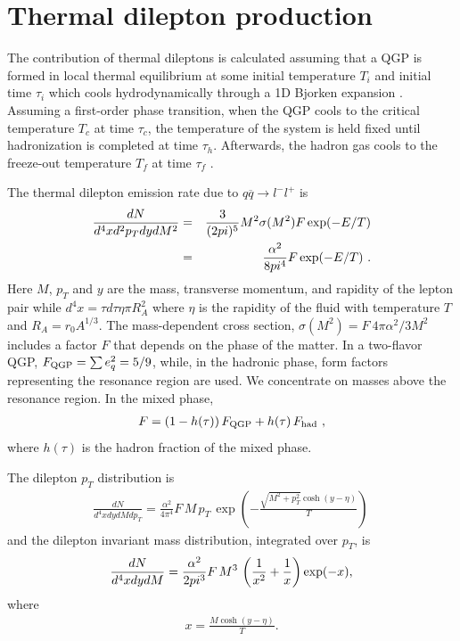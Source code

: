 \section{Thermal dilepton production}

The contribution of thermal dileptons is calculated assuming that
a QGP is formed in local thermal equilibrium at some initial temperature $T_i$ 
and initial time $\tau_i$ which cools hydrodynamically through a 1D Bjorken 
expansion \cite{Bjorken}.  Assuming a first-order phase transition, when the 
QGP cools to the critical temperature 
$T_c$ at time $\tau_c$, the temperature of the system is held fixed until 
hadronization is completed at time $\tau_h$. Afterwards, the hadron gas
cools to the freeze-out temperature $T_f$ at time $\tau_f$ \cite{KAJA}.

The thermal dilepton emission rate due to $q \overline q \rightarrow l^- l^+$
is \cite{KAJA,VOGT} 
\begin{eqnarray}\label{quarkrate}
 {dN \over d^4x d^2p_T dy dM^2} 
&=& \frac{3}{(2\pi)^5} M^2 \sigma(M^2) F
        \exp(-E/T) \nonumber \\
&=& \frac{\alpha^2}{8\pi^4} F 
        \exp(-E/T) \, \, .
\end{eqnarray}
Here $M$, $p_T$ and $y$ are the mass, transverse momentum,
and  rapidity of the lepton pair while $d^4x = \tau d\tau \eta \pi R_A^2$ where
$\eta$ is the rapidity
of the fluid with temperature $T$ and $R_A = r_0 A^{1/3}$.
The mass-dependent cross section, $\sigma(M^2) = F~4\pi\alpha^2/3M^2$ includes a
factor $F$ that depends on the phase of the matter.
In a two-flavor QGP, $F_{\rm QGP} = \sum e_q^2 = 5/9$, while, in the hadronic 
phase, form factors representing the resonance region \cite{GALE} are used.  
We concentrate on masses above the resonance region.
In the mixed phase,
\begin{eqnarray}
F = (1-h(\tau)) \, F_{\rm QGP}
   + h(\tau) \,  F_{\rm had} \, \, ,
\end{eqnarray}
where $h(\tau)$ is the hadron fraction of the mixed phase.

The dilepton $p_T$ distribution is 
\begin{eqnarray}\label{EqnPt}
\frac{dN}{d^4x dy dM dp_T } = \frac{\alpha^2}{4\pi^4}  F \, M \, p_T \,
   \exp\left(-\frac{ \sqrt{M^2 + p_T^2}  \cosh (y-\eta)}{T}\right) \, 
\end{eqnarray}
and the dilepton invariant mass distribution, integrated over $p_T$, is
\begin{eqnarray}\label{EqnM}
\frac{dN}{d^4x dy dM} = \frac{\alpha^2}{2\pi^3} F \, M^3 \,
\left({1\over x^2} + {1\over x}\right) \exp(-x),
\end{eqnarray}
where
\begin{eqnarray}
x=\frac{ M \cosh (y-\eta)}{T}.
\end{eqnarray}


